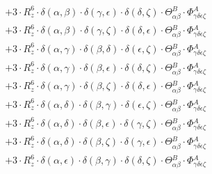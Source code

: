 \documentclass{article}
\begin{document}
\begin{equation}
\begin{array}{c}
 \\[0.2em] 		 + 3 \cdot R_{z}^{6} \cdot \delta{}\left(\alpha{}, \beta{}\right) \cdot \delta{}\left(\gamma{}, \epsilon{}\right) \cdot \delta{}\left(\delta{}, \zeta{}\right) \cdot \Theta{}^{B}_{\alpha{}\beta{}} \cdot \Phi{}^{A}_{\gamma{}\delta{}\epsilon{}\zeta{}} 
 \\[0.2em] 		 + 3 \cdot R_{z}^{6} \cdot \delta{}\left(\alpha{}, \beta{}\right) \cdot \delta{}\left(\gamma{}, \zeta{}\right) \cdot \delta{}\left(\delta{}, \epsilon{}\right) \cdot \Theta{}^{B}_{\alpha{}\beta{}} \cdot \Phi{}^{A}_{\gamma{}\delta{}\epsilon{}\zeta{}} 
 \\[0.2em] 		 + 3 \cdot R_{z}^{6} \cdot \delta{}\left(\alpha{}, \gamma{}\right) \cdot \delta{}\left(\beta{}, \delta{}\right) \cdot \delta{}\left(\epsilon{}, \zeta{}\right) \cdot \Theta{}^{B}_{\alpha{}\beta{}} \cdot \Phi{}^{A}_{\gamma{}\delta{}\epsilon{}\zeta{}} 
 \\[0.2em] 		 + 3 \cdot R_{z}^{6} \cdot \delta{}\left(\alpha{}, \gamma{}\right) \cdot \delta{}\left(\beta{}, \epsilon{}\right) \cdot \delta{}\left(\delta{}, \zeta{}\right) \cdot \Theta{}^{B}_{\alpha{}\beta{}} \cdot \Phi{}^{A}_{\gamma{}\delta{}\epsilon{}\zeta{}} 
 \\[0.2em] 		 + 3 \cdot R_{z}^{6} \cdot \delta{}\left(\alpha{}, \gamma{}\right) \cdot \delta{}\left(\beta{}, \zeta{}\right) \cdot \delta{}\left(\delta{}, \epsilon{}\right) \cdot \Theta{}^{B}_{\alpha{}\beta{}} \cdot \Phi{}^{A}_{\gamma{}\delta{}\epsilon{}\zeta{}} 
 \\[0.2em] 		 + 3 \cdot R_{z}^{6} \cdot \delta{}\left(\alpha{}, \delta{}\right) \cdot \delta{}\left(\beta{}, \gamma{}\right) \cdot \delta{}\left(\epsilon{}, \zeta{}\right) \cdot \Theta{}^{B}_{\alpha{}\beta{}} \cdot \Phi{}^{A}_{\gamma{}\delta{}\epsilon{}\zeta{}} 
 \\[0.2em] 		 + 3 \cdot R_{z}^{6} \cdot \delta{}\left(\alpha{}, \delta{}\right) \cdot \delta{}\left(\beta{}, \epsilon{}\right) \cdot \delta{}\left(\gamma{}, \zeta{}\right) \cdot \Theta{}^{B}_{\alpha{}\beta{}} \cdot \Phi{}^{A}_{\gamma{}\delta{}\epsilon{}\zeta{}} 
 \\[0.2em] 		 + 3 \cdot R_{z}^{6} \cdot \delta{}\left(\alpha{}, \delta{}\right) \cdot \delta{}\left(\beta{}, \zeta{}\right) \cdot \delta{}\left(\gamma{}, \epsilon{}\right) \cdot \Theta{}^{B}_{\alpha{}\beta{}} \cdot \Phi{}^{A}_{\gamma{}\delta{}\epsilon{}\zeta{}} 
 \\[0.2em] 		 + 3 \cdot R_{z}^{6} \cdot \delta{}\left(\alpha{}, \epsilon{}\right) \cdot \delta{}\left(\beta{}, \gamma{}\right) \cdot \delta{}\left(\delta{}, \zeta{}\right) \cdot \Theta{}^{B}_{\alpha{}\beta{}} \cdot \Phi{}^{A}_{\gamma{}\delta{}\epsilon{}\zeta{}} 

\end{array}
\end{equation}
\end{document}
